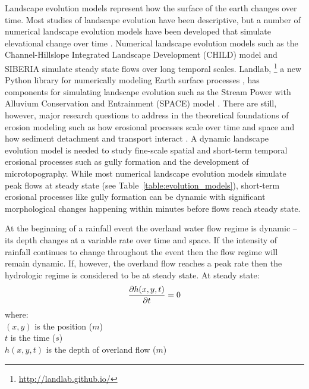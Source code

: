 \documentclass[esurf, manuscript]{copernicus}
\begin{document}
\introduction  %
Landscape evolution models represent how the surface of the earth changes over time. 
Most studies of landscape evolution have been descriptive, 
but a number of numerical landscape evolution models 
have been developed that simulate elevational change over time 
\cite{Temme2013}. 
Numerical landscape evolution models
such as the Channel-Hillslope Integrated Landscape Development (CHILD) model 
\cite{Tucker2001} 
and SIBERIA \cite{Willgoose2005}
simulate steady state flows over long temporal scales. 
Landlab,
\footnote{\url{http://landlab.github.io/}}
a new Python library for numerically modeling Earth surface processes
\cite{Hobley2017},
has components for simulating landscape evolution such as the 
Stream Power with Alluvium Conservation and Entrainment (SPACE) 
model \cite{Shobe2017}.
There are still, however, major research questions 
to address in the theoretical foundations of erosion modeling 
such as how erosional processes scale over time and space 
and how sediment detachment and transport interact \cite{Mitasova2013}. 
A dynamic landscape evolution model is needed to study
fine-scale spatial and short-term temporal erosional processes
such as gully formation and the development of microtopography. 
While most numerical landscape evolution models 
simulate peak flows at steady state
(see Table~\ref{table:evolution_models}),
short-term erosional processes like gully formation can be dynamic
with significant morphological changes happening within minutes
before flows reach steady state. 

At the beginning of a rainfall event 
the overland water flow regime is dynamic -- 
its depth changes at a variable rate over time and space. 
If the intensity of rainfall continues to change throughout the event
then the flow regime will remain dynamic. 
If, however, the overland flow reaches a peak rate
then the hydrologic regime is considered to be at steady state.
At steady state:
\begin{equation}
\label{eq:steady_state}
{\partial h(x,y,t) \over \partial t} = 0 %
\end{equation}
%
{\small
\noindent
where: \\
\noindent
\hspace*{0.5em} $(x,y)$ is the position ($m$)\\
\hspace*{0.5em} $t$ is the time ($s$) \\
\hspace*{0.5em} $h(x,y,t)$ is the depth of overland flow ($m$)\\
}
\end{document}
